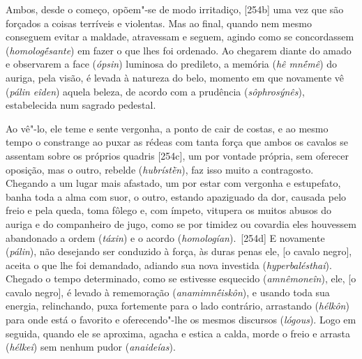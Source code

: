 Ambos, desde o começo, opõem"-se de modo irritadiço, [254b] uma vez
que são forçados a coisas terríveis e violentas. Mas ao final, quando
nem mesmo conseguem evitar a maldade, atravessam e seguem, agindo como
se concordassem (\emph{homologḗsante}) em fazer o que lhes foi ordenado.
Ao chegarem diante do amado e observarem a face (\emph{ópsin}) luminosa
do predileto, a memória (\emph{hê mnḗmê}) do auriga, pela visão, é
levada à natureza do belo, momento em que novamente vê (\emph{pálin
eîden}) aquela beleza, de acordo com a prudência (\emph{sôphrosýnês}),
estabelecida num sagrado pedestal.

Ao vê"-lo, ele teme e sente vergonha, a ponto de cair de costas, e ao
mesmo tempo o constrange ao puxar as rédeas com tanta força que ambos os
cavalos se assentam sobre os próprios quadris [254c], um por vontade
própria, sem oferecer oposição, mas o outro, rebelde (\emph{hubrístḕn}),
faz isso muito a contragosto. Chegando a um lugar mais afastado, um por
estar com vergonha e estupefato, banha toda a alma com suor, o outro,
estando apaziguado da dor, causada pelo freio e pela queda, toma fôlego
e, com ímpeto, vitupera os muitos abusos do auriga e do companheiro de
jugo, como se por timidez ou covardia eles houvessem abandonado a ordem
(\emph{táxin}) e o acordo (\emph{homologían}).~[254d] E novamente
(\emph{pálin}), não desejando ser conduzido à força, às duras penas ele,
[o cavalo negro], aceita o que lhe foi demandado, adiando sua nova
investida (\emph{hyperbalésthai}). Chegado o tempo determinado, como se
estivesse esquecido (\emph{amnêmoneîn}), ele, [o cavalo negro], é
levado à rememoração (\emph{anamimnḗiskôn}), e usando toda sua energia,
relinchando, puxa fortemente para o lado contrário, arrastando
(\emph{hélkôn}) para onde está o favorito e oferecendo"-lhe os mesmos
discursos (\emph{lógous}). Logo em seguida, quando ele se aproxima,
agacha e estica a calda, morde o freio e arrasta (\emph{hélkei}) sem
nenhum pudor (\emph{anaideías}).


